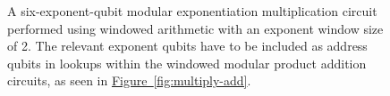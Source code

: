 \documentclass[onecolumn,unpublished]{quantumarticle}
\theoremstyle{definition}
\theoremstyle{definition}
\theoremstyle{definition}
\newcommand{\fig}[1]{\hyperref[fig:#1]{Figure~\ref*{fig:#1}}}
\begin{document}
\begin{figure}[h]
    \caption{
    \label{fig:exponentiation}
    A six-exponent-qubit modular exponentiation multiplication circuit performed using windowed arithmetic with an exponent window size of 2.
    The relevant exponent qubits have to be included as address qubits in lookups within the windowed modular product addition circuits, as seen in \fig{multiply-add}.
    }
\end{figure}
\end{document}

